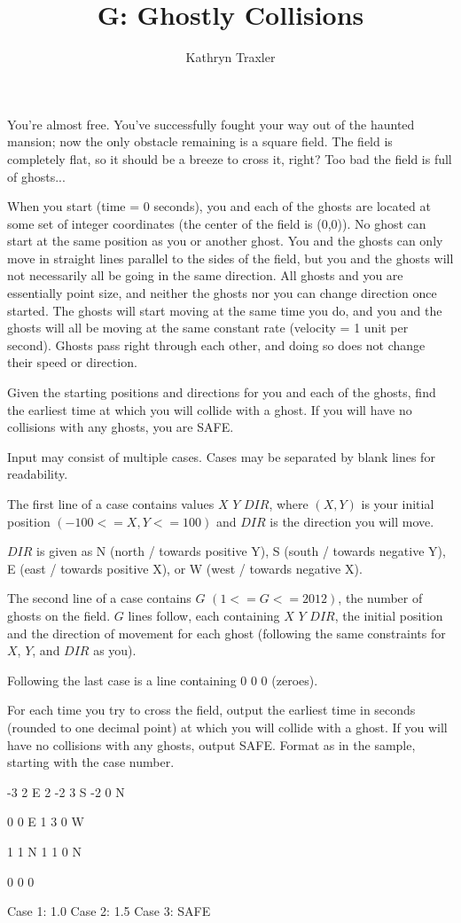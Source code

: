 \documentclass{article}
\title{G: Ghostly Collisions}
\author{Kathryn Traxler}
\begin{document}
\begin{problemDescription}
You're almost free. You've successfully fought your way out of the haunted mansion; 
now the only obstacle remaining is a square field. The field is completely flat, 
so it should be a breeze to cross it, right? Too bad the field is full of ghosts...

When you start (time = 0 seconds), you and each of the ghosts are located at some 
set of integer coordinates (the center of the field is (0,0)). No ghost can start 
at the same position as you or another ghost.  You and the ghosts can only move in 
straight lines parallel to the sides of the field, but you and the ghosts will not 
necessarily all be going in the same direction. All ghosts and you are essentially
point size, and neither the ghosts nor you can change direction once started.
The ghosts will start moving at the same time you do, and you and the ghosts will 
all be moving at the same constant rate (velocity = 1 unit per second).
Ghosts pass right through each other, and doing so does not change their speed 
or direction.

Given the starting positions and directions for you and each of the ghosts, find 
the earliest time at which you will collide with a ghost. If you will have no 
collisions with any ghosts, you are SAFE. 
\end{problemDescription}

\begin{inputDescription}
Input may consist of multiple cases.  Cases may be separated by blank lines
for readability.

The first line of a case contains values $X$ $Y$ $DIR$, where $(X,Y)$
 is your initial position $(-100 <= X, Y <= 100)$ and $DIR$ is the direction 
you will move.

$DIR$ is given as N (north / towards positive Y), S (south / towards negative Y), 
E (east / towards positive X), or W (west / towards negative X).

The second line of a case contains $G$ $(1 <= G <= 2012)$, the number of ghosts on the field. 
$G$ lines follow, each containing $X$ $Y$ $DIR$, the initial position and the direction 
of movement for each ghost (following the same constraints for $X$, $Y$, and $DIR$
 as you).

Following the last case is a line containing 0 0 0 (zeroes).
\end{inputDescription}

\begin{outputDescription}
For each time you try to cross the field, output the earliest time in seconds 
(rounded to one decimal point) at which you will collide with a ghost. If you will 
have no collisions with any ghosts, output SAFE.  Format as in the sample, starting
with the case number.
\end{outputDescription}

\begin{sampleInput}
-3 2 E
2
-2 3 S
-2 0 N

0 0 E
1
3 0 W

1 1 N
1
1 0 N

0 0 0
\end{sampleInput}
\begin{sampleOutput}
Case 1: 1.0
Case 2: 1.5
Case 3: SAFE
\end{sampleOutput}
\end{document}
